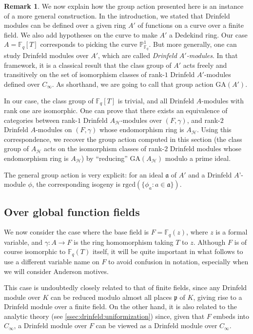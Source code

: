 \documentclass[11pt]{article}
\theoremstyle{definition}
\newtheorem{remark}[theorem]{Remark}
\newcommand\Fq{\mathbb{F}_q}
\newcommand{\p}{\mathfrak{p}}
\renewcommand{\H}{\mathcal H}
\newcommand{\Cinf}{C_{\infty}}
\newcommand{\rgcd}{\mathrm{rgcd}}
\begin{document}
\begin{remark}

  We now explain how the group action presented here is an instance of a 
  more general construction. In the introduction, we stated that Drinfeld
  modules can be defined over a given ring $A'$ of functions on a curve over a
  finite field. We also add hypotheses on the curve to make $A'$ a Dedekind
  ring. Our case $A = \Fq[T]$ corresponds to picking the curve $\mathbb
  P^1_{\Fq}$. But more generally, one can study Drinfeld modules over $A'$,
  which are called \emph{Drinfeld $A'$-modules}. In that framework, it is a
  classical result that the class group of $A'$ acts freely and transitively on
  the set of isomorphism classes of rank-$1$ Drinfeld $A'$-modules defined over
  $\Cinf$. As shorthand, we are going to call that group action
  $\mathrm{GA}(A')$.

  In our case, the class group of $\Fq[T]$ is trivial, and all Drinfeld
  $A$-modules with rank one are isomorphic. One can prove that there exists an
  equivalence of categories between rank-$1$ Drinfeld $A_\H$-modules over
  $(F,\gamma)$, and rank-$2$ Drinfeld $A$-modules on $(F,\gamma)$ whose endomorphism ring is $A_\H$. Using this correspondence, we recover the group
  action computed in this section (the class group of $A_\H$ acts on the
  isomorphism classes of rank-$2$ Drinfeld modules whose endomorphism ring is
  $A_\H$) by ``reducing'' $\mathrm{GA}(A_\H)$ modulo a prime ideal.

  The general group action is very explicit: for an ideal $\mathfrak a$ of $A'$
  and a Drinfeld $A$'-module $\phi$, the corresponding isogeny is
  $\rgcd(\{\phi_a: a \in \mathfrak a\})$.

\end{remark}

\subsection{Over global function fields}
\label{ssec:over-function-fields}

We now consider the case where the base field is $F = \Fq(z)$, where $z$
is a formal variable, and $\gamma : A \to F$ is the ring homomorphism
taking $T$ to $z$.
Although $F$ is of course isomorphic to $\Fq(T)$ itself, it will be 
quite important in what follows to use a different variable name on 
$F$ to avoid confusion in notation, especially when we will consider
Anderson motives.

This case is undoubtedly closely related to that of finite fields,
since any Drinfeld module over $K$ can be reduced modulo almost all places $\p$ of 
$K$, giving rise to a Drinfeld module over a finite field. On the 
other hand, it is also related to the analytic theory (see \cref{ssec:drinfeld:uniformization})
since, given that 
$F$ embeds into $\Cinf$, a Drinfeld module over $F$ can be viewed as a 
Drinfeld module over $\Cinf$.
\end{document}
